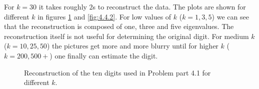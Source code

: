 \documentclass[12pt]{article}
\begin{document}
For $k=30$ it takes roughly $2$s to reconstruct the data. The plots are shown for different $k$ in figures \ref{fig:4.4.1} and \ref{fig:4.4.2}. For low values of $k$ ($k=1,3,5$) we can see that the reconstruction is composed of one, three and five eigenvalues. The reconstruction itself is not useful for determining the original digit. For medium $k$ ($k=10,25,50$) the pictures get more and more blurry until for higher $k$ ($k=200,500+$) one finally can estimate the digit.

\begin{figure}[h!]
	\centering
	\hfill
	\hfill
	\hfill
	\caption[]{Reconstruction of the ten digits used in Problem part 4.1 for different $k$.}
	\label{fig:4.4.1}
\end{figure}
\end{document}
